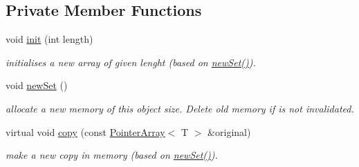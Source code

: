 \subsection*{Private Member Functions}
\begin{DoxyCompactItemize}
\item 
\hypertarget{classplist_1_1PointerArray_a76916e6131dd64abde5939e31eff12ea}{void \hyperlink{classplist_1_1PointerArray_a76916e6131dd64abde5939e31eff12ea}{init} (int length)}\label{classplist_1_1PointerArray_a76916e6131dd64abde5939e31eff12ea}

\begin{DoxyCompactList}\small\item\em initialises a new array of given lenght (based on \hyperlink{classplist_1_1PointerArray_a78496695489f67ccde335701d8103438}{new\-Set()}). \end{DoxyCompactList}\item 
\hypertarget{classplist_1_1PointerArray_a78496695489f67ccde335701d8103438}{void \hyperlink{classplist_1_1PointerArray_a78496695489f67ccde335701d8103438}{new\-Set} ()}\label{classplist_1_1PointerArray_a78496695489f67ccde335701d8103438}

\begin{DoxyCompactList}\small\item\em allocate a new memory of this object size. Delete old memory if is not invalidated. \end{DoxyCompactList}\item 
\hypertarget{classplist_1_1PointerArray_a02260685c3904a903dafabe72b03b0c1}{virtual void \hyperlink{classplist_1_1PointerArray_a02260685c3904a903dafabe72b03b0c1}{copy} (const \hyperlink{classplist_1_1PointerArray}{Pointer\-Array}$<$ T $>$ \&original)}\label{classplist_1_1PointerArray_a02260685c3904a903dafabe72b03b0c1}

\begin{DoxyCompactList}\small\item\em make a new copy in memory (based on \hyperlink{classplist_1_1PointerArray_a78496695489f67ccde335701d8103438}{new\-Set()}). \end{DoxyCompactList}\end{DoxyCompactItemize}
